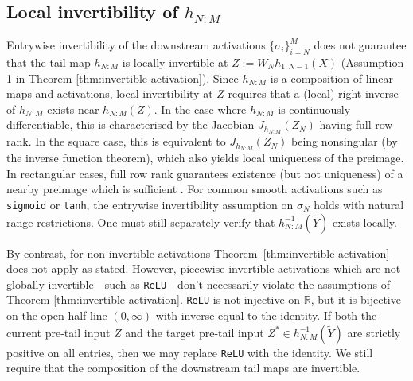 \documentclass{article}
\theoremstyle{plain}
\theoremstyle{definition}
\theoremstyle{remark}
\begin{document}
\subsection{Local invertibility of \(h_{N:M}\)}\label{invert}

Entrywise invertibility of the downstream activations \(\{\sigma_i\}_{i=N}^{M}\) does not  guarantee that the tail map \(h_{N:M}\) is locally invertible at $Z:=W_N h_{1:N-1}(X)$ (Assumption 1 in Theorem \ref{thm:invertible-activation}). Since \(h_{N:M}\) is a composition of linear maps and activations, local invertibility at \(Z\) requires that a (local) right inverse of $h_{N:M}$ exists near $h_{N:M}(Z)$. In the case where $h_{N:M}$ is continuously differentiable, this is characterised by the Jacobian \(J_{h_{N:M}}(Z_N)\) having full row rank. In the square case, this is equivalent to $J_{h_{N:M}}(Z_N)$ being nonsingular (by the inverse function theorem), which also yields local uniqueness of the preimage. In rectangular cases, full row rank guarantees existence (but not uniqueness) of a nearby preimage which is sufficient \cite{ben-israel_generalized_2006}.
For common smooth activations such as \texttt{sigmoid} or \texttt{tanh}, the entrywise invertibility assumption on \(\sigma_N\) holds with natural range restrictions. One must still separately verify that \(h_{N:M}^{-1}(\tilde Y)\) exists locally. 

By contrast, for non-invertible activations Theorem~\ref{thm:invertible-activation} does not apply as stated. However, piecewise invertible activations which are not globally invertible—such as \texttt{ReLU}—don't necessarily violate the assumptions of Theorem \ref{thm:invertible-activation}. \texttt{ReLU} is not injective on $\mathbb{R}$, but it is bijective on the open half-line $(0,\infty)$ with inverse equal to the identity. If both the current pre-tail input $Z$ and the target pre-tail input $Z^\ast\in h_{N:M}^{-1}(\tilde Y)$ are strictly positive on all entries, then we may replace \texttt{ReLU} with the identity. We still require that the composition of the downstream tail maps are invertible.
\end{document}
